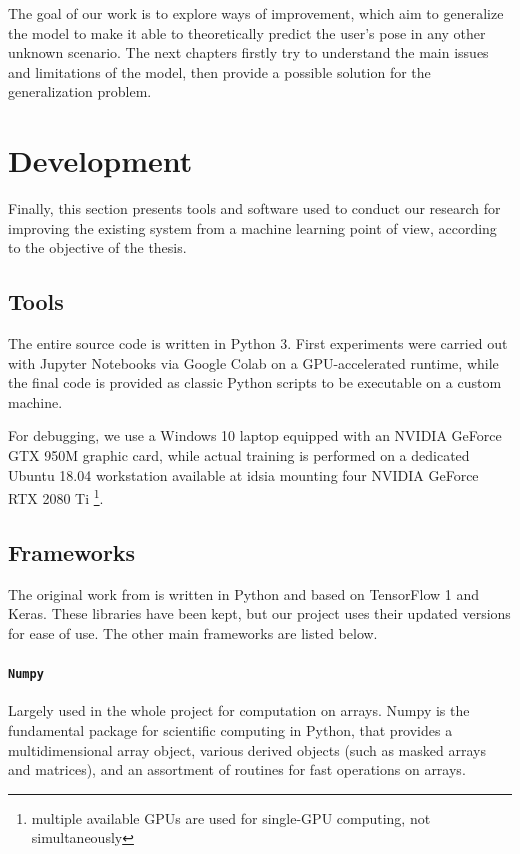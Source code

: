 \bigskip

The goal of our work is to explore ways of improvement, which aim to generalize the model to make it able to theoretically predict the user's pose in any other unknown scenario. The next chapters firstly try to understand the main issues and limitations of the model, then provide a possible solution for the generalization problem.




\section{Development}
\label{sec:software}

Finally, this section presents tools and software used to conduct our research for improving the existing system from a machine learning point of view, according to the objective of the thesis.



\subsection{Tools}
\label{subsec:tools}

The entire source code is written in Python 3. First experiments were carried out with Jupyter Notebooks via Google Colab on a GPU-accelerated runtime, while the final code is provided as classic Python scripts to be executable on a custom machine.

For debugging, we use a Windows 10 laptop equipped with an NVIDIA GeForce GTX 950M graphic card, while actual training is performed on a dedicated Ubuntu 18.04 workstation available at \gls{idsia} mounting four NVIDIA GeForce RTX 2080 Ti \footnote{multiple available GPUs are used for single-GPU computing, not simultaneously}.



\subsection{Frameworks}
\label{subsec:frameworks}

The original work from \cite{mantegazza2019visionbased} is written in Python and based on TensorFlow 1 and Keras. These libraries have been kept, but our project uses their updated versions for ease of use. The other main frameworks are listed below.


\paragraph*{\texttt{Numpy}}
Largely used in the whole project for computation on arrays. Numpy is the fundamental package for scientific computing in Python, that provides a multidimensional array object, various derived objects (such as masked arrays and matrices), and an assortment of routines for fast operations on arrays. 

